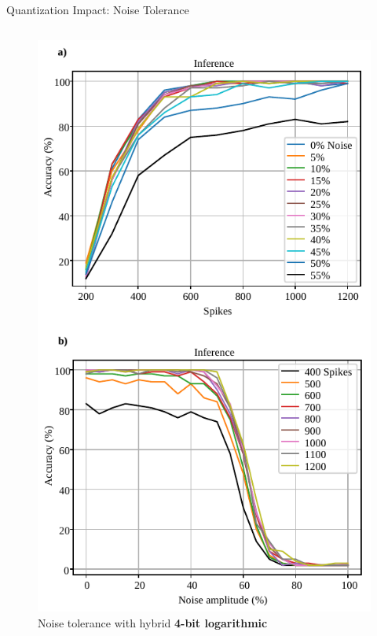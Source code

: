 \begin{frame}{Quantization Impact: Noise Tolerance}
\begin{columns}
		\begin{column}{0.33\textwidth}
			\centering
			\begin{figure}
			\includegraphics[width=0.75\linewidth]{../chapters/sbs_accelerator/figures/accuracy_vs_noise_pu_log.pdf} %
			\caption{ Noise tolerance with hybrid \textbf{4-bit logarithmic}}
			\end{figure}
		\end{column}
	\end{columns}
\end{frame}

